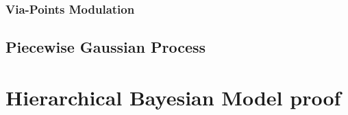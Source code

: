 \documentclass{article}
\begin{document}
\subsubsection{Via-Points Modulation}


\subsection{Piecewise Gaussian Process}


\FloatBarrier




\appendix
\section{Hierarchical Bayesian Model proof}
\end{document}
